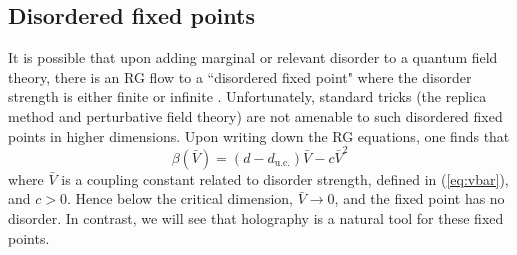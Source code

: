 \documentclass[10pt, oneside]{book}
\begin{document}
\begin{doublespace}
\subsection{Disordered fixed points}\label{sec:disfpt}
It is possible that upon adding marginal or relevant disorder to a quantum field theory, there is an RG flow to a ``disordered fixed point"  where the disorder strength is either finite or infinite  \cite{fisher1999}.      Unfortunately, standard tricks (the replica method and perturbative field theory) are not amenable to such disordered fixed points in higher dimensions.   Upon writing down the RG equations, one finds that \cite{ssbook} \begin{equation}
\beta(\bar V) = (d-d_{\mathrm{u.c.}})\bar V - c \bar V^2
\end{equation}
where $\bar V$ is a coupling constant related to disorder strength, defined in (\ref{eq:vbar}), and $c>0$.  Hence below the critical dimension,  $\bar V \rightarrow 0$, and the fixed point has no disorder.   In contrast, we will see that holography is a natural tool for these fixed points.


\end{doublespace}
\end{document}

